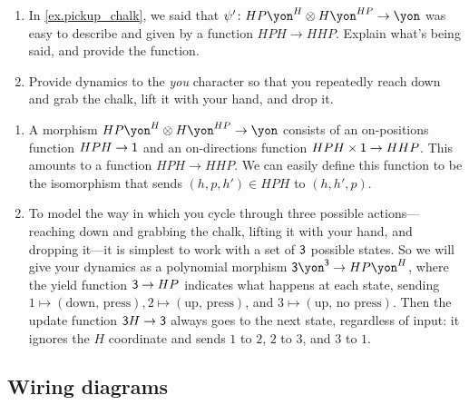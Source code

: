 \documentclass[Book-Poly]{subfiles}
\begin{document}
\begin{exercise}\label{exc.pickup_chalk}
\begin{enumerate}
	\item In \cref{ex.pickup_chalk}, we said that $\psi'\colon HP\yon^H\otimes H\yon^{HP}\to\yon$ was easy to describe and given by a function $HPH\to HHP$. Explain what's being said, and provide the function.
	\item Provide dynamics to the \textit{you} character so that you repeatedly reach down and grab the chalk, lift it with your hand, and drop it. 
\qedhere
\end{enumerate}
\begin{solution}
\begin{enumerate}
    \item A morphism $HP\yon^H \otimes H\yon^{HP} \to \yon$ consists of an on-positions function $HPH \to \textsf{1}$ and an on-directions function $HPH \times \textsf{1} \to HHP$.
    This amounts to a function $HPH \to HHP$.
    We can easily define this function to be the isomorphism that sends $(h,p,h') \in HPH$ to $(h,h',p)$.
    \item To model the way in which you cycle through three possible actions---reaching down and grabbing the chalk, lifting it with your hand, and dropping it---it is simplest to work with a set of $\textsf{3}$ possible states.
    So we will give your dynamics as a polynomial morphism $\3\yon^\3 \to HP\yon^H$, where the yield function $\textsf{3} \to HP$ indicates what happens at each state, sending $1 \mapsto (\text{down, press}), 2 \mapsto (\text{up, press})$, and $3 \mapsto (\text{up, no press})$.
    Then the update function $\textsf{3}H \to \textsf{3}$ always goes to the next state, regardless of input: it ignores the $H$ coordinate and sends $1$ to $2$, $2$ to $3$, and $3$ to $1$.
\end{enumerate}
\end{solution}
\end{exercise}

\subsection{Wiring diagrams}
\end{document}
